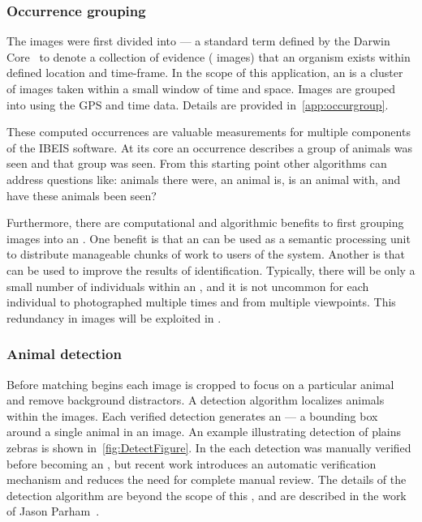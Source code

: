         \subsubsection{Occurrence grouping}
            The images were first divided into \glossterm{\occurrences{}} --- a standard term defined by the Darwin
            Core~\cite{wieczorek_darwin_2012} to denote a collection of evidence (\eg{} images) that an organism exists
            within defined location and time-frame. In the scope of this application, an \occurrence{} is a cluster of
            images taken within a small window of time and space. Images are grouped into \occurrences{} using the GPS
            and time data. Details are provided in~\cref{app:occurgroup}.

            These computed occurrences are valuable measurements for multiple components of the IBEIS software.
            At its core an occurrence describes  a group of animals was seen and  that
              group was seen.
            From this starting point other algorithms can address questions like:
             animals there were,  an animal is,  is an animal with,
              and  have these animals been seen?
            
            Furthermore, there are computational and algorithmic benefits to first grouping images into an
              \occurrence{}.
            One benefit is that an \occurrence{} can be used as a semantic processing unit to distribute
              manageable chunks of work to users of the system.
            Another is that \occurrences{} can be used to improve the results of identification.
            Typically, there will be only a small number of individuals within an \occurrence{}, and it is not
              uncommon for each individual to photographed multiple times and from multiple viewpoints.
            This redundancy in images will be exploited in .

        \subsubsection{Animal detection}
            Before matching begins each image is cropped to focus on a particular animal and remove background
            distractors. A detection algorithm localizes animals within the images. Each verified detection
            generates an \glossterm{\annot{}} --- a bounding box around a single animal in an image. An example
            illustrating detection of plains zebras is shown in~\cref{fig:DetectFigure}. In the \GZC{} each
            detection was manually verified before becoming an \annot{}, but recent work introduces an automatic
            verification mechanism and reduces the need for complete manual review. The details of the detection
            algorithm are beyond the scope of this \thesis{}, and are described in the work of Jason
            Parham~\cite{parham_photographic_2015,parham_detecting_2016}.

